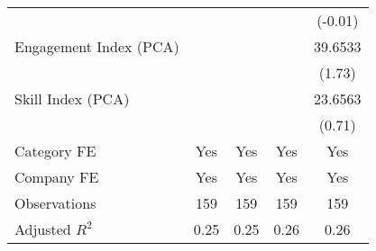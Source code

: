 {\begin{tabular}{l*{4}{c}}
                                   &                   &                   &                   &   (-0.01)         \\
[1em]
Engagement Index (PCA)             &                   &                   &                   &   39.6533\sym{*}  \\
                                   &                   &                   &                   &    (1.73)         \\
[1em]
Skill Index (PCA)                  &                   &                   &                   &   23.6563         \\
                                   &                   &                   &                   &    (0.71)         \\
[1em]
Category FE                        &       Yes         &       Yes         &       Yes         &       Yes         \\
[1em]
Company FE                         &       Yes         &       Yes         &       Yes         &       Yes         \\
\hline
Observations                       &       159         &       159         &       159         &       159         \\
Adjusted \(R^{2}\)                 &      0.25         &      0.25         &      0.26         &      0.26         \\
\hline\hline
\end{tabular}
}
